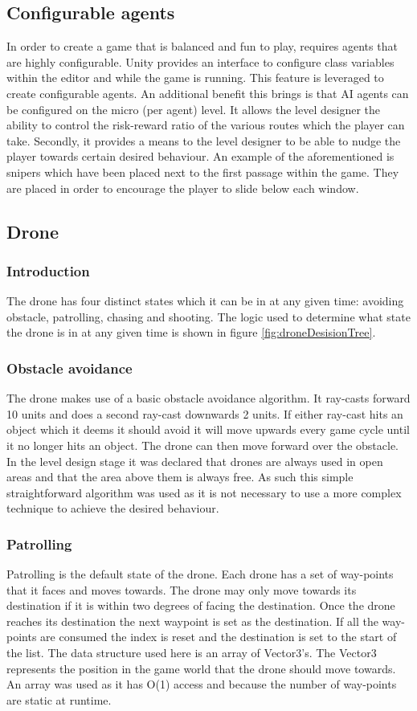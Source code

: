 \documentclass[11pt,a4paper]{article}
\begin{document}
\subsection{Configurable agents}
In order to create a game that is balanced and fun to play, requires agents that are highly configurable. Unity provides an interface to configure class variables within the editor and while the game is running. This feature is leveraged to create configurable agents. An additional benefit this brings is that AI agents can be configured on the micro (per agent) level. It allows the level designer the ability to control the risk-reward ratio of the various routes which the player can take. Secondly, it provides a means to the level designer to be able to nudge the player towards certain desired behaviour. An example of the aforementioned is snipers which have been placed next to the first passage within the game. They are placed in order to encourage the player to slide below each window. 
\subsection{Drone}
\subsubsection{Introduction}
The drone has four distinct states which it can be in at any given time: avoiding obstacle, patrolling, chasing and shooting. The logic used to determine what state the drone is in at any given time is shown in figure \ref{fig:droneDesisionTree}.
\subsubsection{Obstacle avoidance}
The drone makes use of a basic obstacle avoidance algorithm. It ray-casts forward 10 units and does a second ray-cast downwards 2 units. If either ray-cast hits an object which it deems it should avoid it will move upwards every game cycle until it no longer hits an object. The drone can then move forward over the obstacle. In the level design stage it was declared that drones are always used in open areas and that the area above them is always free. As such this simple straightforward algorithm was used as it is not necessary to use a more complex technique to achieve the desired behaviour.
\subsubsection{Patrolling}
Patrolling is the default state of the drone. Each drone has a set of way-points that it faces and moves towards. The drone may only move towards its destination if it is within two degrees of facing the destination. Once the drone reaches its destination the next waypoint is set as the destination. If all the way-points are consumed the index is reset and the destination is set to the start of the list. The data structure used here is an array of Vector3's. The Vector3 represents the position in the game world that the drone should move towards. An array was used as it has O(1) access and because the number of way-points are static at runtime.
\end{document}
